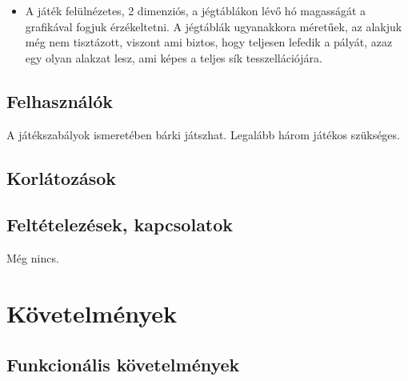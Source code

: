 \begin{itemize}
\item A játék felülnézetes, 2 dimenziós, a jégtáblákon lévő hó magasságát a grafikával fogjuk érzékeltetni. A jégtáblák ugyanakkora méretűek, az alakjuk még nem tisztázott, viszont ami biztos, hogy teljesen lefedik a pályát, azaz egy olyan alakzat lesz, ami képes a teljes sík tesszellációjára.
\end{itemize}
\subsection{Felhasználók}
A játékszabályok ismeretében bárki játszhat. Legalább három játékos szükséges.

\subsection{Korlátozások}

\subsection{Feltételezések, kapcsolatok}
Még nincs.

\section{Követelmények}
\subsection{Funkcionális követelmények}



